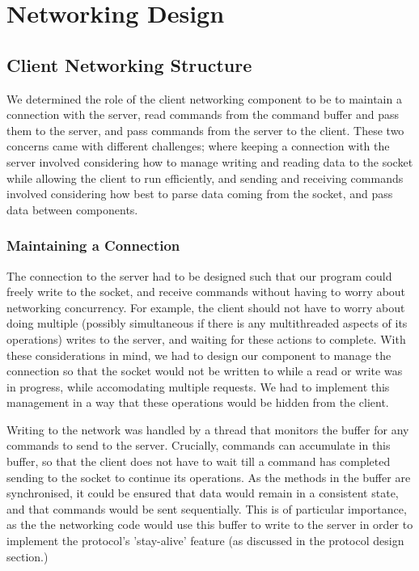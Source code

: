 \section{Networking Design}

\subsection{Client Networking Structure}

We determined the role of the client networking component to be to maintain a connection with the server, read commands from the command buffer and pass them to the server, and pass commands from the server to the client. These two concerns came with different challenges; where keeping a connection with the server involved considering how to manage writing and reading data to the socket while allowing the client to run efficiently, and sending and receiving commands involved considering how best to parse data coming from the socket, and pass data between components.

\subsubsection {Maintaining a Connection}

The connection to the server had to be designed such that our program could freely write to the socket, and receive commands without having to worry about networking concurrency. For example, the client should not have to worry about doing multiple (possibly simultaneous if there is any multithreaded aspects of its operations) writes to the server, and waiting for these actions to complete. With these considerations in mind, we had to design our component to manage the connection so that the socket would not be written to while a read or write was in progress, while accomodating multiple requests. We had to implement this management in a way that these operations would be hidden from the client. 

Writing to the network was handled by a thread that monitors the buffer for any commands to send to the server. Crucially, commands can accumulate in this buffer, so that the client does not have to wait till a command has completed sending to the socket to continue its operations. As the methods in the buffer are synchronised, it could be ensured that data would remain in a consistent state, and that commands would be sent sequentially. This is of particular importance, as the the networking code would use this buffer to write to the server in order to implement the protocol's 'stay-alive' feature (as discussed in the protocol design section.)  

